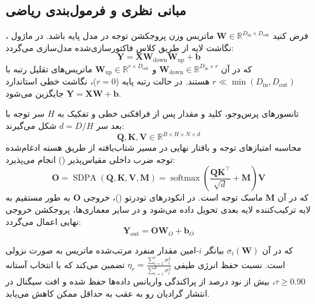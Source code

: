 \subsection{مبانی نظری و فرمول‌بندی ریاضی}
فرض کنید $\mathbf{W} \in \mathbb{R}^{D_{\text{in}} \times D_{\text{out}}}$ ماتریس وزن پروجکشن توجه در مدل پایه باشد. در ماژول ، نگاشت لایه از طریق کلاس فاکتورسازی‌شده  مدل‌سازی می‌گردد:
\begin{equation}
\mathbf{Y} = \mathbf{X} \mathbf{W}_{\text{down}} \mathbf{W}_{\text{up}} + \mathbf{b}
\end{equation}
که در آن $\mathbf{W}_{\text{down}} \in \mathbb{R}^{D_{\text{in}} \times r}$ و $\mathbf{W}_{\text{up}} \in \mathbb{R}^{r \times D_{\text{out}}}$ ماتریس‌های تقلیل رتبه با  $r \ll \min(D_{\text{in}}, D_{\text{out}})$ هستند. در حالت رتبه پایه ($r=0$)، نگاشت خطی استاندارد $\mathbf{Y} = \mathbf{X} \mathbf{W} + \mathbf{b}$ جایگزین می‌شود.

تانسورهای پرس‌وجو، کلید و مقدار پس از فرافکنی خطی و تفکیک به $H$ سر توجه با بعد سر $d = D/H$ شکل می‌گیرند:
\begin{equation}
\mathbf{Q}, \mathbf{K}, \mathbf{V} \in \mathbb{R}^{B \times H \times N \times d}
\end{equation}
محاسبه امتیازهای توجه و بافتار نهایی در مسیر شتاب‌یافته از طریق هسته ادغام‌شده توجه ضرب داخلی مقیاس‌پذیر () انجام می‌پذیرد:
\begin{equation}
\mathbf{O} = \operatorname{SDPA}(\mathbf{Q}, \mathbf{K}, \mathbf{V}, \mathbf{M}) = \operatorname{softmax}\left(\frac{\mathbf{Q} \mathbf{K}^\top}{\sqrt{d}} + \mathbf{M}\right) \mathbf{V}
\end{equation}
که در آن $\mathbf{M}$ ماسک توجه است. در انکودرهای تودرتو ()، خروجی $\mathbf{O}$ به طور مستقیم به لایه ترکیب‌کننده لایه بعدی تحویل داده می‌شود و در سایر معماری‌ها، پروجکشن خروجی نهایی اعمال می‌گردد:
\begin{equation}
\mathbf{Y}_{\text{out}} = \mathbf{O} \mathbf{W}_O + \mathbf{b}_O
\end{equation}

که در آن $\sigma_i(\mathbf{W})$ بیانگر $i$-امین مقدار منفرد مرتب‌شده ماتریس به صورت نزولی است. نسبت حفظ انرژی طیفی $\eta_r = \frac{\sum_{i=1}^r \sigma_i^2}{\sum_{i=1}^{d} \sigma_i^2}$ تضمین می‌کند که با انتخاب آستانه $\tau \ge 0.90$، بیش از نود درصد از پراکندگی واریانس داده‌ها حفظ شده و افت سیگنال در انتشار گرادیان رو به عقب به حداقل ممکن کاهش می‌یابد.

